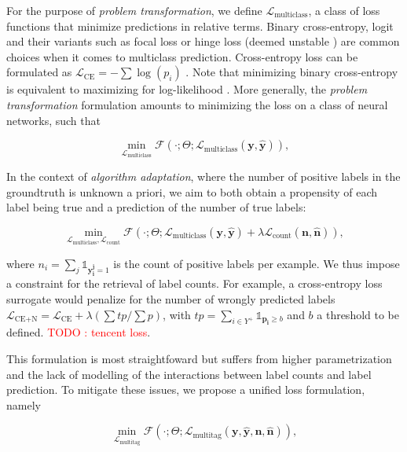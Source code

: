 \documentclass[sigconf,natbib,screen=true,review=true,anonymous]{acmart}
\newcommand\todo[1]{\textcolor{red}{TODO : #1}}
\begin{document}
For the purpose of \emph{problem transformation}, we define \(\mathcal{L}_{\text {multiclass}}\), a class of loss functions that minimize predictions in relative terms. Binary cross-entropy, logit and their variants such as focal loss or hinge loss (deemed unstable \cite{focalLoss}) are common choices when it comes to multiclass prediction. Cross-entropy loss can be formulated as \(\mathcal{L}_{\text {CE}}=-\sum \log \left(p_{i}\right)\) . Note that minimizing binary cross-entropy is equivalent to maximizing for log-likelihood \cite[Section 4.3.4]{Bishop}. More generally, the \emph{problem transformation} formulation amounts to minimizing the loss on a class of neural networks, such that

\begin{equation}
\underset{\mathcal{L}_{\text {multiclass}}} {\min} \mathcal{F}\left(\cdot ; \Theta; \mathcal{L}_{\text {multiclass}} (\mathbf{y}, \hat{\mathbf{y}}) \right),
\end{equation}

In the context of \emph{algorithm adaptation}, where the number of positive labels in the groundtruth is unknown a priori, we aim to both obtain a propensity of each label being true and a prediction of the number of true labels: 

\begin{equation}
\underset{\mathcal{L}_{\text {multiclass}}, \mathcal{L}_{\text {count}}} {\min} \mathcal{F}\left(\cdot ; \Theta; \mathcal{L}_{\text {multiclass}} (\mathbf{y}, \hat{\mathbf{y}}) + \lambda \mathcal{L}_{\text {count}} (\mathbf{n}, \hat{\mathbf{n}})\right),
\end{equation}

where \(n_i = \sum_j \mathds{1}_{\mathbf{y_i^j} = 1}\) is the count of positive labels per example. We thus impose a constraint for the retrieval of label counts. For example, a cross-entropy loss surrogate would penalize for the number of wrongly predicted labels \(\mathcal{L}_{\text {CE+N}}= \mathcal{L}_{\text {CE}} + \lambda (\sum tp / \sum p)\), with \(t p=\sum_{i \in Y^{+}} \mathds{1}_{\mathbf{p_i} \geq b}\) and \(b\) a threshold to be defined. \todo{tencent loss}.

This formulation is most straightfoward but suffers from higher parametrization and the lack of modelling of the interactions between label counts and label prediction. To mitigate these issues, we propose a unified loss formulation, namely

\begin{equation}
\underset{\mathcal{L}_{\text {multitag}}} {\min} \mathcal{F}\left(\cdot ; \Theta; \mathcal{L}_{\text {multitag}} (\mathbf{y}, \hat{\mathbf{y}}, \mathbf{n}, \hat{\mathbf{n}}) \right),
\end{equation}
\end{document}
